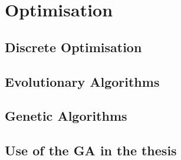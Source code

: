 \documentclass[ExampleMasters.tex]{subfiles}
\begin{document}
\chapter{Optimisation}
\lipsum

\section{Discrete Optimisation}
\lipsum

\section{Evolutionary Algorithms}
\lipsum

\section{Genetic Algorithms}
\lipsum

\section{Use of the GA in the thesis}
\lipsum
\end{document}
